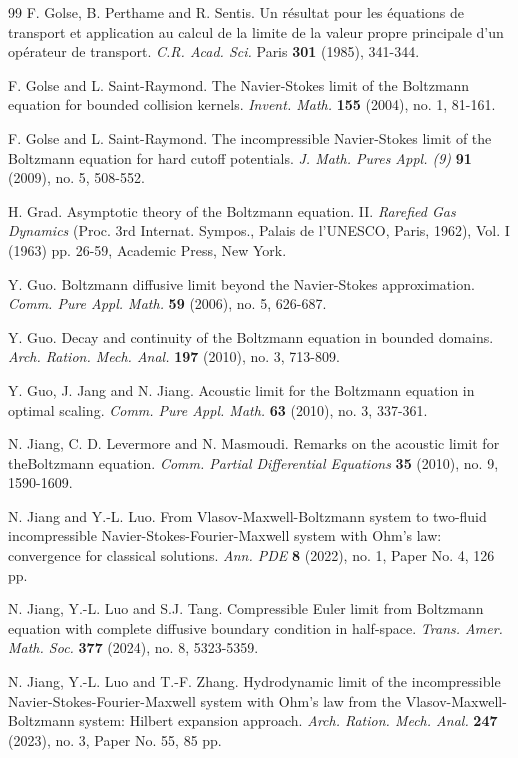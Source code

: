 \documentclass[reqno,11pt]{amsart}
\numberwithin{equation}{section}
\begin{document}
\begin{thebibliography}{99}
F. Golse, B. Perthame and R. Sentis. Un résultat pour les équations de transport et application au calcul de la limite de la valeur propre principale d'un opérateur de transport. {\em C.R. Acad. Sci.} Paris {\bf 301} (1985), 341-344. 
    
 F. Golse and L. Saint-Raymond. The Navier-Stokes limit of the Boltzmann equation for bounded collision kernels. {\em Invent. Math.} {\bf 155} (2004), no. 1, 81-161.
    
 F. Golse and L. Saint-Raymond. The incompressible Navier-Stokes limit of the Boltzmann equation for hard cutoff potentials. {\em J. Math. Pures Appl. (9)} {\bf 91} (2009), no. 5, 508-552.

 H. Grad. Asymptotic theory of the Boltzmann equation. II. {\em Rarefied Gas Dynamics} (Proc. 3rd Internat. Sympos., Palais de l'UNESCO, Paris, 1962), Vol. I (1963) pp. 26-59, Academic Press, New York.
    
 Y. Guo. Boltzmann diffusive limit beyond the Navier-Stokes approximation. {\em Comm. Pure Appl. Math.} {\bf 59} (2006), no. 5, 626-687.
    
 Y. Guo. Decay and continuity of the Boltzmann equation in bounded domains. {\em Arch. Ration. Mech. Anal.} {\bf 197} (2010), no. 3, 713-809.

 Y. Guo, J. Jang and N. Jiang. Acoustic limit for the Boltzmann equation in optimal scaling. {\em Comm. Pure Appl. Math.} {\bf 63} (2010), no. 3, 337-361.
    
 N. Jiang, C. D. Levermore and N. Masmoudi. Remarks on the acoustic limit for theBoltzmann equation. {\em Comm. Partial Differential Equations} {\bf 35} (2010), no. 9, 1590-1609.
    
 N. Jiang and Y.-L. Luo. From Vlasov-Maxwell-Boltzmann system to two-fluid incompressible Navier-Stokes-Fourier-Maxwell system with Ohm's law: convergence for classical solutions. {\em Ann. PDE} {\bf 8} (2022), no. 1, Paper No. 4, 126 pp.
    
 N. Jiang, Y.-L. Luo and S.J. Tang. Compressible Euler limit from Boltzmann equation with complete diffusive boundary condition in half-space. {\em Trans. Amer. Math. Soc.} {\bf 377} (2024), no. 8, 5323-5359.
    
 N. Jiang, Y.-L. Luo and T.-F. Zhang. Hydrodynamic limit of the incompressible Navier-Stokes-Fourier-Maxwell system with Ohm's law from the Vlasov-Maxwell-Boltzmann system: Hilbert expansion approach. {\em Arch. Ration. Mech. Anal.} {\bf 247} (2023), no. 3, Paper No. 55, 85 pp.
    

\end{thebibliography}
\end{document}

